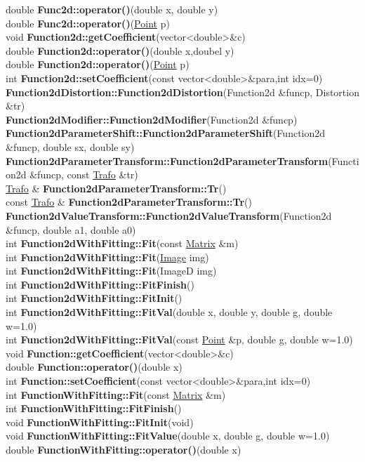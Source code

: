 \documentclass[10pt,titlepage]{article}
\def\functionlistentry#1#2#3#4#5#6{\noindent #1 {\bf #2}(#3) \dotfill #6\\}
\def\letterref#1{}
\def\letterlabelend#1{}
\begin{document}
{{\letterref{Fe}
\letterref{Fi}
\letterref{Fm}
\letterref{Fo}
\letterref{Fr}
\letterref{Fu}
\letterlabelend{Fu}
\functionlistentry{double}{Func2d::operator()}{double x, double y}{1030}{functions}{}
\functionlistentry{double}{Func2d::operator()}{\hyperlink{Point}{Point} p}{1031}{functions}{}
\functionlistentry{void}{Function2d::getCoefficient}{vector\textless {}double\textgreater  \&c}{1021}{functions}{}
\functionlistentry{double}{Function2d::operator()}{double x,doubel y}{1019}{functions}{}
\functionlistentry{double}{Function2d::operator()}{\hyperlink{Point}{Point} p}{1020}{functions}{}
\functionlistentry{int}{Function2d::setCoefficient}{const vector\textless {}double\textgreater  \&para,int idx=0}{1022}{functions}{}
\functionlistentry{}{Function2dDistortion::Function2dDistortion}{Function2d \&funcp, Distortion \&tr}{1059}{functions}{}
\functionlistentry{}{Function2dModifier::Function2dModifier}{Function2d \&funcp}{1054}{functions}{}
\functionlistentry{}{Function2dParameterShift::Function2dParameterShift}{Function2d \&funcp, double sx, double sy}{1055}{functions}{}
\functionlistentry{}{Function2dParameterTransform::Function2dParameterTransform}{Function2d \&funcp, const \hyperlink{Trafo}{Trafo} \&tr}{1056}{functions}{}
\functionlistentry{\hyperlink{Trafo}{Trafo} \&}{Function2dParameterTransform::Tr}{}{1057}{functions}{}
\functionlistentry{const \hyperlink{Trafo}{Trafo} \&}{Function2dParameterTransform::Tr}{}{1058}{functions}{}
\functionlistentry{}{Function2dValueTransform::Function2dValueTransform}{Function2d \&funcp, double a1, double a0}{1060}{functions}{}
\functionlistentry{int}{Function2dWithFitting::Fit}{const \hyperlink{Matrix}{Matrix} \&m}{1027}{functions}{}
\functionlistentry{int}{Function2dWithFitting::Fit}{\hyperlink{Image}{Image} img}{1028}{functions}{}
\functionlistentry{int}{Function2dWithFitting::Fit}{ImageD img}{1029}{functions}{}
\functionlistentry{int}{Function2dWithFitting::FitFinish}{}{1026}{functions}{}
\functionlistentry{int}{Function2dWithFitting::FitInit}{}{1023}{functions}{}
\functionlistentry{int}{Function2dWithFitting::FitVal}{double x, double y, double g, double w=1.0}{1024}{functions}{}
\functionlistentry{int}{Function2dWithFitting::FitVal}{const \hyperlink{Point}{Point} \&p, double g, double w=1.0}{1025}{functions}{}
\functionlistentry{void}{Function::getCoefficient}{vector\textless {}double\textgreater  \&c}{990}{functions}{}
\functionlistentry{double}{Function::operator()}{double x}{989}{functions}{}
\functionlistentry{int}{Function::setCoefficient}{const vector\textless {}double\textgreater  \&para,int idx=0}{991}{functions}{}
\functionlistentry{int}{FunctionWithFitting::Fit}{const \hyperlink{Matrix}{Matrix} \&m}{995}{functions}{}
\functionlistentry{int}{FunctionWithFitting::FitFinish}{}{994}{functions}{}
\functionlistentry{void}{FunctionWithFitting::FitInit}{void}{992}{functions}{}
\functionlistentry{void}{FunctionWithFitting::FitValue}{double x, double g, double w=1.0}{993}{functions}{}
\functionlistentry{double}{FunctionWithFitting::operator()}{double x}{996}{functions}{}

}}
\end{document}
